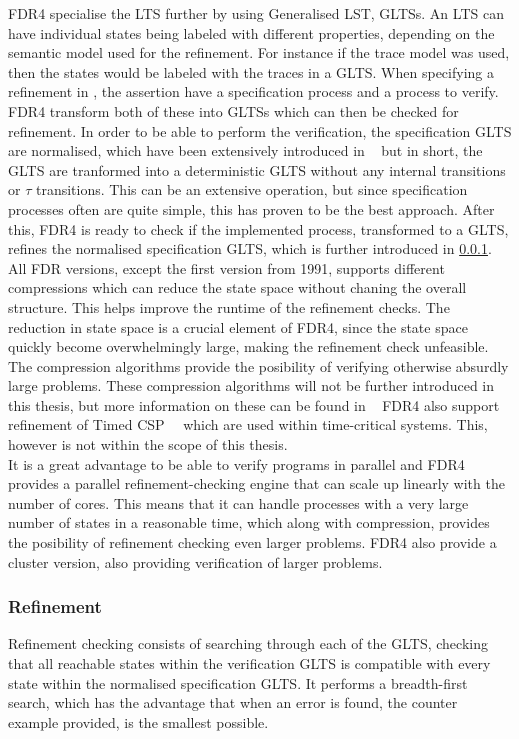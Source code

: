 FDR4 specialise the LTS further by using Generalised LST, GLTSs. An LTS can have individual states being labeled with different properties, depending on the semantic model used for the refinement. For instance if the trace model was used, then the states would be labeled with the traces in a GLTS.
When specifying a refinement in \cspm, the assertion have a specification process and a process to verify. FDR4 transform both of these into GLTSs which can then be checked for refinement. In order to be able to perform the verification, the specification GLTS are normalised, which have been extensively introduced in ~\cite{Roscoe1997} but in short, the GLTS are tranformed into a deterministic GLTS without any internal transitions or $\tau$ transitions. This can be an extensive operation, but since specification processes often are quite simple, this has proven to be the best approach.
After this, FDR4 is ready to check if the implemented process, transformed to a GLTS, refines the normalised specification GLTS, which is further introduced in \ref{sec:refinement}.
All FDR versions, except the first version from 1991, supports different compressions which can reduce the state space without chaning the overall structure. This helps improve the runtime of the refinement checks. The reduction in state space is a crucial element of FDR4, since the state space quickly become overwhelmingly large, making the refinement check unfeasible. The compression algorithms provide the posibility of verifying otherwise absurdly large problems.
These compression algorithms will not be further introduced in this thesis, but more information on these can be found in ~\cite{Roscoe2010}
FDR4 also support refinement of Timed CSP~\cite{REED1988249}~\cite{Armstrong2011} which are used within time-critical systems. This, however is not within the scope of this thesis. \\

It is a great advantage to be able to verify programs in parallel and FDR4 provides a parallel refinement-checking engine that can scale up linearly with the number of cores. This means that it can handle processes with a very large number of states in a reasonable time, which along with compression, provides the posibility of refinement checking even larger problems. FDR4 also provide a cluster version, also providing verification of larger problems.




\subsubsection{Refinement}
\label{sec:refinement}
Refinement checking consists of searching through each of the GLTS, checking that all reachable states within the verification GLTS is compatible with every state within the normalised specification GLTS. It performs a breadth-first search, which has the advantage that when an error is found, the counter example provided, is the smallest possible.

